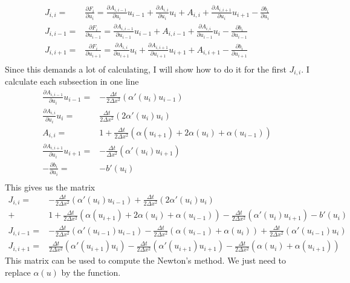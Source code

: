 \documentclass{article}
\begin{document}
\begin{align*}
J_{i,i}=& \frac{\partial F_i}{\partial u_i}=\frac{\partial A_{i,i-1}}{\partial u_i}u_{i-1}
+ \frac{\partial A_{i,i}}{\partial u_i}u_i+ A_{i,i}
+ \frac{\partial A_{i,i+1}}{\partial u_i}u_{i+1}
- \frac{\partial b_i}{\partial u_{i}}\\ 
J_{i,i-1}=& \frac{\partial F_i}{\partial u_{i-1}}=\frac{\partial A_{i,i-1}}{\partial u_{i-1}}u_{i-1}
+ A_{i,i-1}+\frac{\partial A_{i,i}}{\partial u_{i-1}}u_i
- \frac{\partial b_i}{\partial u_{i-1}}\\ 
J_{i,i+1}=& \frac{\partial F_i}{\partial u_{i+1}}= \frac{\partial A_{i,i}}{\partial u_{i+1}}u_i
+ \frac{\partial A_{i,i+1}}{\partial u_{i+1}}u_{i+1}+A_{i,i+1}
- \frac{\partial b_i}{\partial u_{i+1}}\\ 
\end{align*}
Since this demands a lot of calculating, I will show how to do it for the first
$J_{i,i}$. I calculate each subsection in one line
\begin{align*}
\frac{\partial A_{i,i-1}}{\partial u_i}u_{i-1}=&-\frac{\Delta t}{2\Delta x^2}(\alpha'(u_i)u_{i-1})\\
\frac{\partial A_{i,i}}{\partial u_i}u_i=&\frac{\Delta t}{2\Delta x^2}(2\alpha'(u_i)u_{i})\\
A_{i,i}=&1+\frac{\Delta t}{2\Delta x^2}(\alpha(u_{i+1})+2\alpha(u_i)+\alpha(u_{i-1}))\\
\frac{\partial A_{i,i+1}}{\partial u_i}u_{i+1}=&-\frac{\Delta t}{\Delta x^2}(\alpha'(u_i)u_{i+1})\\
- \frac{\partial b_i}{\partial u_{i}}=& -b'(u_i)\\
\end{align*}
This gives us the matrix
\begin{align*}
J_{i,i} =&-\frac{\Delta t}{2\Delta x^2}(\alpha'(u_i)u_{i-1})+\frac{\Delta t}{2\Delta x^2}(2\alpha'(u_i)u_{i})\\
+&1+\frac{\Delta t}{2\Delta x^2}(\alpha(u_{i+1})+2\alpha(u_i)+\alpha(u_{i-1}))-\frac{\Delta t}{2\Delta x^2}(\alpha'(u_i)u_{i+1})-b'(u_i)\\
J_{i,i-1} =&-\frac{\Delta t}{2\Delta x^2}(\alpha'(u_{i-1})u_{i-1})-\frac{\Delta t}{2\Delta x^2}(\alpha(u_{i-1})+\alpha(u_i))+\frac{\Delta t}{2\Delta x^2}(\alpha'(u_{i-1})u_{i})\\
J_{i,i+1} =&\frac{\Delta t}{2\Delta x^2}(\alpha'(u_{i+1})u_{i})-\frac{\Delta t}{2\Delta x^2}(\alpha'(u_{i+1})u_{i+1})-\frac{\Delta t}{2\Delta x^2}(\alpha(u_i)+\alpha(u_{i+1}))
\end{align*}
This matrix can be used to compute the Newton's method. We just need to replace $\alpha(u)$ by the function. 

\printindex
\end{document}
